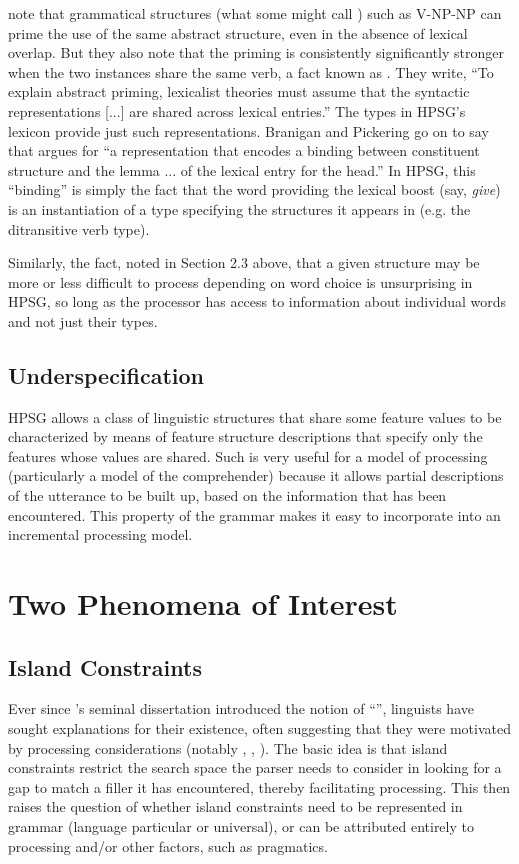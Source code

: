 \documentclass[a4paper]{article}
\begin{document}
\citet{BraniganPickering2017} note that grammatical structures (what some might call ) such as V-NP-NP can prime the use of the same abstract structure, even in the absence of lexical overlap.  But they also note that the priming is consistently significantly stronger when the two instances share the same verb, a fact known as .  They write, ``To explain abstract
priming, lexicalist theories must assume that the syntactic
representations [...]
are shared across lexical entries.''  The types in HPSG's lexicon provide just such representations.  Branigan and Pickering go on to say that  argues for ``a representation that
encodes a binding between constituent structure and the
lemma ... of the lexical entry for the
head.''  In HPSG, this ``binding'' is simply the fact that the word providing the lexical boost (say, {\it give}) is an instantiation of a type specifying the structures it appears in (e.g. the ditransitive verb type).

Similarly, the fact, noted in Section 2.3 above, that a given structure may be more or less difficult to process depending on word choice is unsurprising in HPSG, so long as the processor has access to information about individual words and not just their types.   
\subsection{Underspecification}

HPSG allows a class of linguistic structures that share some feature values to be characterized by means of feature structure descriptions that specify only the features whose values are shared.  Such  is very useful for a model of processing (particularly a model of the comprehender) because it allows partial descriptions of the utterance to be built up, based on the information that has been encountered.  This property of the grammar makes it easy to incorporate into an incremental processing model.

\section{Two Phenomena of Interest}
\subsection{Island Constraints}

Ever since \citeauthor{Ross67}'s seminal dissertation \citeyearpar{Ross67} introduced the notion of ``'', linguists have sought explanations for their existence, often suggesting that they were motivated by processing considerations (notably \citet{Grosu72-u}, \citet{Fodor83}, \citet{Deane91}).  The basic idea is that island constraints restrict the search space the parser needs to consider in looking for a gap to match a filler it has encountered, thereby facilitating processing.  This then raises the question of whether island constraints need to be represented in grammar (language particular or universal), or can be attributed entirely to processing and/or other factors, such as pragmatics.
\end{document}
